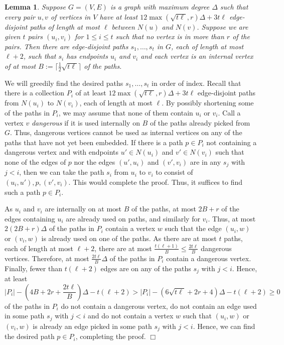 \documentclass[11pt]{article}
\newtheorem{lemma}[theorem]{Lemma}
\newenvironment{proof}
      {\medskip\noindent{\bf Proof:}\hspace{1mm}}
      {\hfill$\Box$\medskip}
\begin{document}
\begin{lemma}\label{nice0}
Suppose $G=(V,E)$ is a graph with maximum degree $\Delta$ such that every pair $u,v$ of vertices in $V$ have at least $12\max\left(\sqrt{t\ell},r\right)\Delta+3t\ell$ edge-disjoint paths of length at most $\ell$ between $N(u)$ and $N(v)$. Suppose we are given $t$ pairs $(u_i,v_i)$ for $1 \leq i \leq t$ such that no vertex is in more than $r$ of the pairs. Then there are edge-disjoint paths $s_1,\ldots,s_t$ in $G$, each of length at most $\ell + 2$, such that $s_i$ has endpoints $u_i$ and $v_i$ and each vertex is an internal vertex of at most $B:=\lceil \frac{1}{2}\sqrt{t \ell} \rceil$ of the paths.
\end{lemma}
\begin{proof}
We will greedily find the desired paths $s_1,\ldots,s_t$ in order of index. Recall that there is a collection $P_i$ of at least $12\max\left(\sqrt{t\ell},r\right)\Delta + 3t \ell$ edge-disjoint paths from $N(u_i)$ to $N(v_i)$, each of length at most $\ell$. By possibly shortening some of the paths in $P_i$, we may assume that none of them contain $u_i$ or $v_i$. Call a vertex $v$ {\it dangerous} if it is used internally on $B$ of the paths already picked from $G$. Thus, dangerous vertices cannot be used as internal vertices on any of the paths that have not yet been embedded. If there is a path $p \in P_i$ not containing a dangerous vertex and with endpoints $u' \in N(u_i)$ and $v' \in N(v_i)$ such that none of the edges of $p$ nor the edges $(u',u_i)$ and $(v',v_i)$ are in any $s_j$ with $j<i$, then we can take the path $s_i$ from $u_i$ to $v_i$ to consist of $(u_i,u'),p,(v',v_i)$. This would complete the proof. Thus, it suffices to find such a path $p \in P_i$.

As $u_i$ and $v_i$ are internally on at most $B$ of the paths, at most $2B+r$ of the edges containing $u_i$ are already used on paths, and similarly for $v_i$. Thus, at most $2(2B+r)\Delta$ of the paths in $P_i$ contain a vertex $w$ such that the edge $(u_i,w)$ or $(v_i,w)$ is already used on one of the paths. As there are at most $t$ paths, each of length at most $\ell + 2$, there are at most $\frac{t(\ell + 1)}{B} \leq \frac{2 t \ell}{B}$  dangerous vertices. Therefore, at most $\frac{2t\ell}{B}\Delta$ of the paths in $P_i$ contain a dangerous vertex. Finally, fewer than $t(\ell+2)$ edges are on any of the paths $s_j$ with $j<i$. Hence, at least
$$|P_i|-\left(4B+2r+\frac{2t\ell}{B}\right)\Delta-t(\ell+2)>|P_i|-(6\sqrt{t\ell}+2r + 4)\Delta  -t(\ell+2)\geq 0$$
of the paths in $P_i$  do not contain a dangerous vertex, do not contain an edge used in some path $s_j$ with $j < i$ and do not contain a vertex $w$ such that $(u_i,w)$ or $(v_i,w)$ is already an edge picked in some path $s_j$ with $j<i$.  Hence, we can find the desired path $p \in P_i$, completing the proof.
\end{proof}
\end{document}
